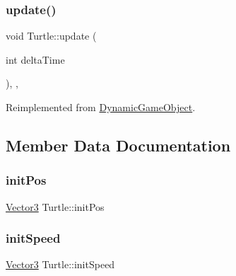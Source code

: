 \mbox{\label{class_turtle_a6d62e3f4e21f5ce3ffb4e7e2a8a9da1b}} 
\subsubsection{\texorpdfstring{update()}{update()}}
{\footnotesize\ttfamily void Turtle\+::update (\begin{DoxyParamCaption}\item[{int}]{delta\+Time }\end{DoxyParamCaption})\hspace{0.3cm}{\ttfamily [inline]}, {\ttfamily [override]}, {\ttfamily [virtual]}}



Reimplemented from \hyperlink{class_dynamic_game_object_aaa505b57d131bbbce44d500ec2ca0e83}{Dynamic\+Game\+Object}.



\subsection{Member Data Documentation}
\mbox{\label{class_turtle_a9052d3e0b90f7334d5fb3ac37617b3a6}} 
\subsubsection{\texorpdfstring{init\+Pos}{initPos}}
{\footnotesize\ttfamily \hyperlink{class_vector3}{Vector3} Turtle\+::init\+Pos}

\mbox{\label{class_turtle_a085cc226004058c86277dfe21a2dc077}} 
\subsubsection{\texorpdfstring{init\+Speed}{initSpeed}}
{\footnotesize\ttfamily \hyperlink{class_vector3}{Vector3} Turtle\+::init\+Speed}

\mbox{\label{class_turtle_a4a81d2f3cef8a9d8556f05b6356d0fd2}} 
